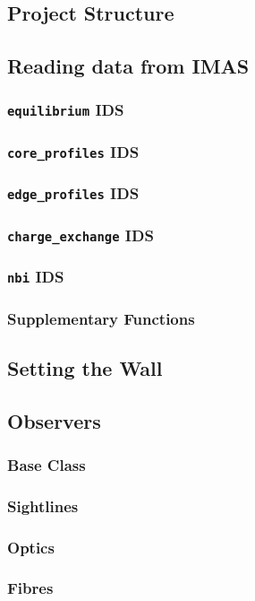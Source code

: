 \documentclass[../main.tex]{subfiles}
\begin{document}
\subsection{Project Structure}
\subsection{Reading data from IMAS}
\subsubsection{\texttt{equilibrium} IDS}
\subsubsection{\texttt{core\_profiles} IDS}
\subsubsection{\texttt{edge\_profiles} IDS}
\subsubsection{\texttt{charge\_exchange} IDS}
\subsubsection{\texttt{nbi} IDS}
\subsubsection{Supplementary Functions}
\subsection{Setting the Wall}
\subsection{Observers}
\subsubsection{Base Class}
\subsubsection{Sightlines}
\subsubsection{Optics}
\subsubsection{Fibres}
\end{document}
